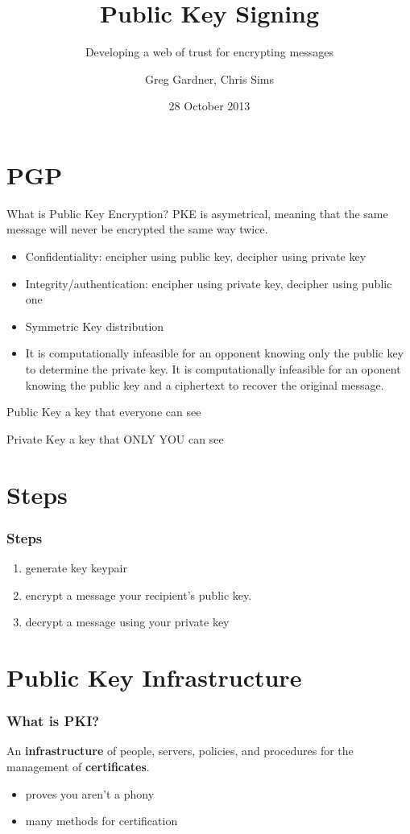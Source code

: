 \documentclass{beamer}
\title{Public Key Signing}
\subtitle{Developing a web of trust for encrypting messages}
\author{Greg Gardner, Chris Sims}
\date{28 October 2013}
\begin{document}
\frame{\titlepage}


\section{PGP}
\begin{frame}{What is Public Key Encryption?}
  PKE is asymetrical, meaning that the same message will never be encrypted the same way twice.
  \begin{itemize}
  \item Confidentiality: encipher using public key, decipher using private key
  \item Integrity/authentication: encipher using private key, decipher using public one
  \item Symmetric Key distribution
  \item It is computationally infeasible for an opponent knowing only the public key to determine the private key.
It is computationally infeasible for an oponent knowing the public key and a ciphertext to recover the original message.
  \end{itemize}
  
  \begin{block}{Public Key}
  a key that everyone can see
  \end{block}
  \begin{block}{Private Key}
  a key that ONLY YOU can see
  \end{block}
\end{frame}

\section{Steps}
\begin{frame}\frametitle{Steps}
  \begin{enumerate}
    \item generate key keypair
    \item encrypt a message your recipient's public key.
    \item decrypt a message using your private key
  \end{enumerate}
\end{frame}

\section{Public Key Infrastructure}
\begin{frame}\frametitle{What is PKI?}
	An {\bf infrastructure} of people, servers, policies, and procedures for the management of {\bf certificates}.
	
	\begin{itemize}
		\item proves you aren't a phony
		\item many methods for certification
	\end{itemize}
\end{frame}
\end{document}
